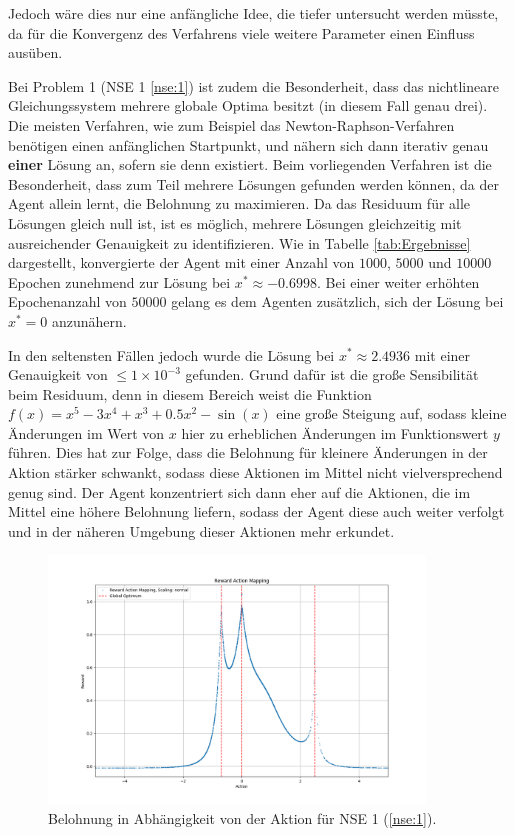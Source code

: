 \documentclass{article}
\theoremstyle{newline}
\begin{document}
\begin{onehalfspace}
Jedoch wäre dies nur eine anfängliche Idee, die tiefer untersucht werden müsste, da für die Konvergenz des Verfahrens viele weitere Parameter einen Einfluss ausüben.
\medskip

Bei Problem 1 (NSE 1 \ref{nse:1}) ist zudem die Besonderheit, dass das nichtlineare Gleichungssystem mehrere globale Optima besitzt (in diesem Fall genau drei). Die meisten Verfahren, wie zum Beispiel das Newton-Raphson-Verfahren benötigen einen anfänglichen Startpunkt, und nähern sich dann iterativ genau \textbf{einer} Lösung an, sofern sie denn existiert. Beim vorliegenden Verfahren ist die Besonderheit, dass zum Teil mehrere Lösungen gefunden werden können, da der Agent allein lernt, die Belohnung zu maximieren. Da das Residuum für alle Lösungen gleich null ist, ist es möglich, mehrere Lösungen gleichzeitig mit ausreichender Genauigkeit zu identifizieren. Wie in Tabelle \ref{tab:Ergebnisse} dargestellt, konvergierte der Agent mit einer Anzahl von $1000$, $5000$ und $10000$ Epochen zunehmend zur Lösung bei $x^{\ast} \approx -0.6998$. Bei einer weiter erhöhten Epochenanzahl von $50000$ gelang es dem Agenten zusätzlich, sich der Lösung bei $x^{\ast} = 0$ anzunähern.

In den seltensten Fällen jedoch wurde die Lösung bei $x^{\ast} \approx 2.4936$ mit einer Genauigkeit von $\leq 1 \times 10^{-3}$ gefunden. Grund dafür ist die große Sensibilität beim Residuum, denn in diesem Bereich weist die Funktion $f(x) = x^5 - 3x^4+x^3+0.5x^2 - \sin(x)$ eine große Steigung auf, sodass kleine Änderungen im Wert von $x$ hier zu erheblichen Änderungen im Funktionswert $y$ führen. Dies hat zur Folge, dass die Belohnung für kleinere Änderungen in der Aktion stärker schwankt, sodass diese Aktionen im Mittel nicht vielversprechend genug sind. Der Agent konzentriert sich dann eher auf die Aktionen, die im Mittel eine höhere Belohnung liefern, sodass der Agent diese auch weiter verfolgt und in der näheren Umgebung dieser Aktionen mehr erkundet.

\begin{figure}[h]
	\centering
	\includegraphics[width=10cm]{Bilder/reward_action_inverse.png}
	\caption{Belohnung in Abhängigkeit von der Aktion für NSE 1 (\ref{nse:1}).}
	\label{fig:reward-action-nse1-inverse}
\end{figure}
\medskip


\end{onehalfspace}
\end{document}
